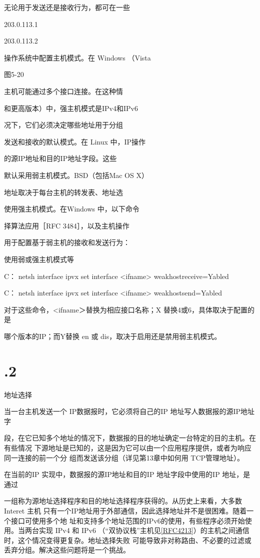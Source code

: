 无论用于发送还是接收行为，都可在一些

203.0.113.1

203.0.113.2

操作系统中配置主机模式。在 Windows （Vista

图5-20

主机可能通过多个接口连接。在这种情

和更高版本）中，强主机模式是IPv4和IPv6

况下，它们必须决定哪些地址用于分组

发送和接收的默认模式。在 Linux 中，IP操作

的源IP地址和目的IP地址字段。这些

默认采用弱主机模式。BSD（包括Mac OS X）

地址取决于每台主机的转发表、地址选

使用强主机模式。在Windows 中，以下命令

择算法应用［RFC 3484］，以及主机操作

用于配置基于弱主机的接收和发送行为：

使用弱或强主机模式等

C：\> netsh interface ipvx set interface <ifname> weakhostreceive=Yabled

C：\> netsh interface ipvx set interface <ifname> weakhostsend=Yabled

对于这些命令，<ifname＞替换为相应接口名称；X 替换4或6，具体取决于配置的是

哪个版本的IP；而Y替换 en 或 dis，取决于启用还是禁用弱主机模式。

\section{.2}
地址选择

当一台主机发送一个 IP数据报时，它必须将自己的IP 地址写人数据报的源IP地址字

段，在它已知多个地址的情况下，数据报的目的地址确定一台特定的目的主机。在有些情况
下源地址是已知的，这是因为它可以由一个应用程序提供，或者为响应同一连接的前一个分
组而发送该分组（详见第13章中如何用 TCP管理地址）。

在当前的IP 实现中，数据报的源IP地址和目的IP 地址字段中使用的IP 地址，是通过

一组称为源地址选择程序和目的地址选择程序获得的。从历史上来看，大多数 Interet 主机
只有一个IP地址用于外部通信，因此选择地址并不是很困难。随着一个接口可使用多个地
址和支持多个地址范围的IPv6的使用，有些程序必须开始使用。当两台实现 IPv4 和 IPv6
（“双协议栈”主机见\href{https://www.rfc-editor.org/rfc/rfc4213}{[RFC4213]}）的主机之间通信时，这个情况变得更复杂。地址选择失败
可能导致非对称路由、不必要的过滤或丢弃分组。解决这些问题将是一个挑战。

